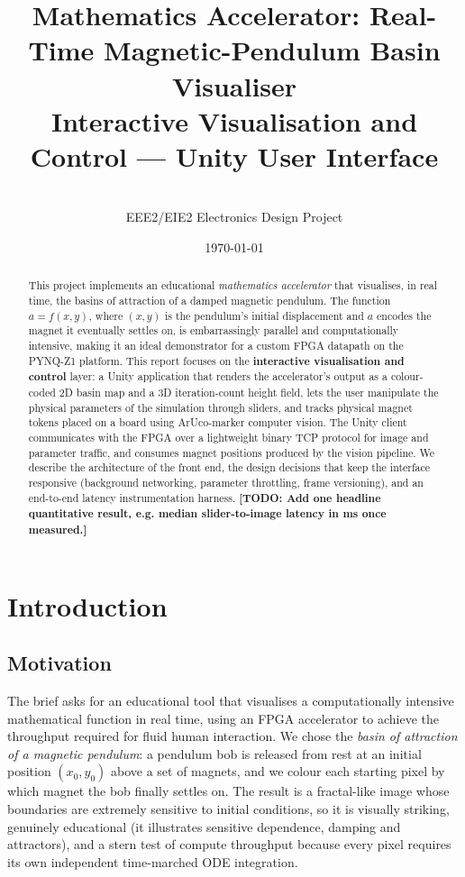 \documentclass[11pt,a4paper]{article}
\title{\textbf{Mathematics Accelerator: Real-Time Magnetic-Pendulum Basin Visualiser}\\[4pt]
\large Interactive Visualisation and Control --- Unity User Interface}
\author{\todo{Author name and CID} \\ EEE2/EIE2 Electronics Design Project}
\date{\today}
\newcommand{\todo}[1]{\textcolor{red!75!black}{\textbf{[TODO: #1]}}}
\begin{document}
\maketitle

\begin{abstract}
This project implements an educational \emph{mathematics accelerator} that
visualises, in real time, the basins of attraction of a damped magnetic
pendulum. The function $a=f(x,y)$, where $(x,y)$ is the pendulum's initial
displacement and $a$ encodes the magnet it eventually settles on, is
embarrassingly parallel and computationally intensive, making it an ideal
demonstrator for a custom FPGA datapath on the PYNQ-Z1 platform. This report
focuses on the \textbf{interactive visualisation and control} layer: a Unity
application that renders the accelerator's output as a colour-coded 2D basin
map and a 3D iteration-count height field, lets the user manipulate the
physical parameters of the simulation through sliders, and tracks physical
magnet tokens placed on a board using ArUco-marker computer vision. The Unity
client communicates with the FPGA over a lightweight binary TCP protocol for
image and parameter traffic, and consumes magnet positions produced by the
vision pipeline. We describe the architecture of the front end, the design
decisions that keep the interface responsive (background networking,
parameter throttling, frame versioning), and an end-to-end latency
instrumentation harness. \todo{Add one headline quantitative result, e.g.
median slider-to-image latency in ms once measured.}
\end{abstract}

\section{Introduction}

\subsection{Motivation}
The brief asks for an educational tool that visualises a computationally
intensive mathematical function in real time, using an FPGA accelerator to
achieve the throughput required for fluid human interaction. We chose the
\emph{basin of attraction of a magnetic pendulum}: a pendulum bob is released
from rest at an initial position $(x_0,y_0)$ above a set of magnets, and we
colour each starting pixel by which magnet the bob finally settles on. The
result is a fractal-like image whose boundaries are extremely sensitive to
initial conditions, so it is visually striking, genuinely educational
(it illustrates sensitive dependence, damping and attractors), and a stern
test of compute throughput because every pixel requires its own independent
time-marched ODE integration.
\end{document}
